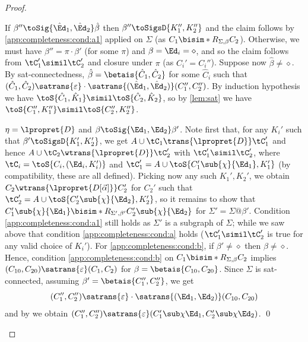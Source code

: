 \begin{proof}
\begin{asparaitem}
  If $\beta''\toSig{\hat\Ed_1,\hat\Ed_2}\hat\beta$ then $\beta''\toSigsD{K_1'',K_2''}$ and the claim follows by \cref{app:completeness:cond:a1} applied on $\Sigma$ (as $C_1\bisim*R_{\Sigma,\beta}C_2$). Otherwise, we must have $\beta''=\pi\cdot\beta'$ (for some $\pi$) and $\beta=\Ed_i=\diamond$, and so the claim follows from $\tC_1'\simil\tC_2'$  and closure under $\pi$ (as $C_i'=C_i''$).
  Suppose now $\hat\beta\neq\diamond$. By sat-connectedness, $\hat\beta =\betais{\hat C_1,\hat C_2}$
for some $\hat C_i$ such that 
$(\hat C_1,\hat C_2)\satrans{\varepsilon}\cdot\satrans{(\hat\Ed_1,\hat\Ed_2)}( C_1'', C_2'')$.
  By induction hypothesis we have $\toS{\hat C_1,\hat K_1}\simil\toS{\hat C_2,\hat K_2}$, so by \cref{lem:sat} we have $\toS{ C_1'', K_1''}\simil\toS{ C_2'', K_2''}$. %
\item $\eta=\lpropret{D}$ and $\beta\toSig{\Ed_1,\Ed_2}\beta'$.
  Note first that, for any $K_i'$ such that $\beta'\toSigsD{K_1',K_2'}$, we get $A\cup\tC_1\trans{\lpropret{D}}\tC_1'$ and hence $A\cup\tC_2\wtrans{\lpropret{D}}\tC_2'$ with $\tC_1'\simil\tC_2'$, where  $\tC_i=\toS{C_i,(\Ed_i,K_i')}$ and
 $\tC_1'=A\cup\toS{C_1'\sub{\chi}{\Ed_1},K_1'}$ (by compatibility, these are all defined).
Picking now any such $K_1',K_2'$,
we obtain $C_2\wtrans{\lpropret{D[\vec\alpha]}}C_2'$ for $C_2'$ such that $\tC_2'=A\cup\toS{C_2'\sub{\chi}{\Ed_2},K_2'}$, so it remains to show that $C_1'\sub{\chi}{\Ed_1}\bisim*R_{\Sigma',\beta'} C_2'\sub{\chi}{\Ed_2}$ for $\Sigma'=\Sigma@\beta'$. Condition \cref{app:completeness:cond:a1} still holds as $\Sigma'$ is a subgraph of $\Sigma$; while we saw above that condition \cref{app:completeness:cond:a} holds ($\tC_1'\simil\tC_2'$ is true for any valid choice of $K_i'$).
  For \cref{app:completeness:cond:b}, if 
  $\beta'\not=\diamond$
then $\beta\neq\diamond$. Hence, condition \cref{app:completeness:cond:b} on $C_1\bisim*R_{\Sigma,\beta}C_2$ implies 
$
(C_{10},C_{20})\satrans{\varepsilon}(C_1,C_2)
$
for $\beta=\betais{C_{10},C_{20}}$. Since $\Sigma$ is sat-connected,
assuming  $\beta'=\betais{C_1'',C_2''}$, we get 
\[
(C_{1}'',C_{2}'')\satrans{\varepsilon}\cdot\satrans{(\Ed_1,\Ed_2)}( C_{10}, C_{20})
\]
and by  %
we obtain $(C_{1}'',C_{2}'')\satrans{\varepsilon}( C_1'\sub\chi{\Ed_1}, C_2'\sub\chi{\Ed_2})$. 
\qed
\end{asparaitem}

\end{proof}

